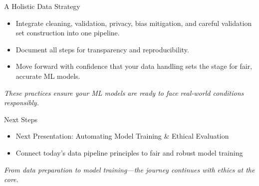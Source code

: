 \documentclass[aspectratio=169]{beamer}
\begin{document}
%
\begin{frame}{A Holistic Data Strategy}
\begin{itemize}
\item Integrate cleaning, validation, privacy, bias mitigation, and careful validation set construction into one pipeline.
\item Document all steps for transparency and reproducibility.
\item Move forward with confidence that your data handling sets the stage for fair, accurate ML models.
\end{itemize}

\emph{These practices ensure your ML models are ready to face real-world conditions responsibly.}
\end{frame}

%
\begin{frame}{Next Steps}
\begin{itemize}
\item Next Presentation: Automating Model Training \& Ethical Evaluation
\item Connect today’s data pipeline principles to fair and robust model training
\end{itemize}

\emph{From data preparation to model training—the journey continues with ethics at the core.}
\end{frame}
\end{document}
